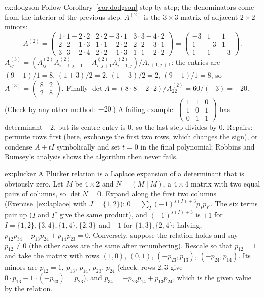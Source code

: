 \begin{solution}{ex:dodgson}
\idea Follow Corollary~\ref{cor:dodgson} step by step; the denominators come from the interior of the previous step.
\writeup $A^{(2)}$ is the $3\times3$ matrix of adjacent $2\times2$ minors:
\[
A^{(2)}=\begin{pmatrix}1\cdot1-2\cdot2&2\cdot2-3\cdot1&3\cdot3-4\cdot2\\2\cdot2-1\cdot3&1\cdot1-2\cdot2&2\cdot2-3\cdot1\\3\cdot3-2\cdot4&2\cdot2-1\cdot3&1\cdot1-2\cdot2\end{pmatrix}=\begin{pmatrix}-3&1&1\\1&-3&1\\1&1&-3\end{pmatrix}.
\]
$A^{(3)}_{ij}=(A^{(2)}_{ij}A^{(2)}_{i+1,j+1}-A^{(2)}_{i,j+1}A^{(2)}_{i+1,j})/A_{i+1,j+1}$: the entries are
$(9-1)/1=8$, $(1+3)/2=2$, $(1+3)/2=2$, $(9-1)/1=8$, so $A^{(3)}=\begin{pmatrix}8&2\\2&8\end{pmatrix}$. Finally
$\det A=(8\cdot8-2\cdot2)/A^{(2)}_{22}=60/(-3)=-20$. (Check by any other method: $-20$.) A failing example:
$\begin{pmatrix}1&1&0\\1&0&1\\0&1&1\end{pmatrix}$ has determinant $-2$, but its centre entry is $0$, so the last step divides by
$0$. Repairs: permute rows first (here, exchange the first two rows, which changes the sign), or condense $A+tI$
symbolically and set $t=0$ in the final polynomial; Robbins and Rumsey's analysis shows the algorithm then never fails.
\end{solution}

\begin{solution}{ex:plucker}
\idea A Pl\"ucker relation is a Laplace expansion of a determinant that is obviously zero.
\writeup Let $M$ be $4\times2$ and $N=(M\mid M)$, a $4\times4$ matrix with two equal pairs of columns, so $\det N=0$. Expand
along the first two columns (Exercise~\ref{ex:laplace} with $J=\{1,2\}$): $0=\sum_I(-1)^{s(I)+3}p_Ip_{I^c}$. The six terms
pair up ($I$ and $I^c$ give the same product), and $(-1)^{s(I)+3}$ is $+1$ for $I=\{1,2\},\{3,4\},\{1,4\},\{2,3\}$ and
$-1$ for $\{1,3\},\{2,4\}$; halving, $p_{12}p_{34}-p_{13}p_{24}+p_{14}p_{23}=0$. Conversely, suppose the relation holds and
say $p_{12}\ne0$ (the other cases are the same after renumbering). Rescale so that $p_{12}=1$ and take the matrix with rows
$(1,0)$, $(0,1)$, $(-p_{23},p_{13})$, $(-p_{24},p_{14})$. Its minors are $p_{12}=1$, $p_{13}$, $p_{14}$, $p_{23}$, $p_{24}$ (check:
rows $2,3$ give $0\cdot p_{13}-1\cdot(-p_{23})=p_{23}$), and $p_{34}=-p_{23}p_{14}+p_{13}p_{24}$, which is the given value by the
relation.
\end{solution}

